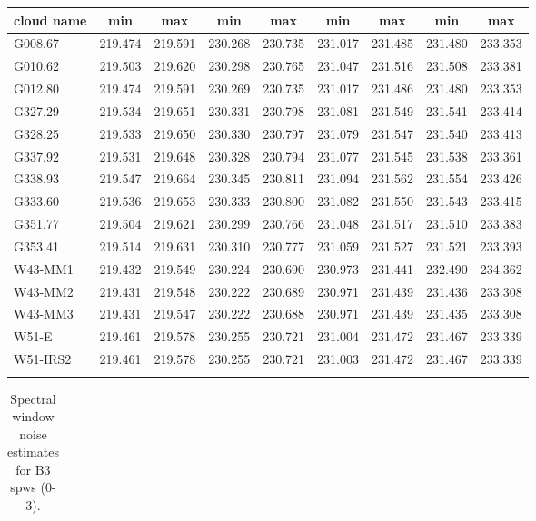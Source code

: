 \documentclass[longauth]{aa} %
\begin{document}
\begin{appendix}
\begin{table}[htbp!]
\begin{tabular}{@{\extracolsep{6pt}}lcccccccc@{}}
cloud name\tnote{1}  & min & max  & min & max  & min & max  & min & max  \\
\hline \noalign {\smallskip}
G008.67 & 219.474&219.591&230.268&230.735&231.017&231.485&231.480&233.353 \\
G010.62 & 219.503&219.620&230.298&230.765&231.047&231.516&231.508&233.381 \\
G012.80 & 219.474&219.591&230.269&230.735&231.017&231.486&231.480&233.353 \\
G327.29 & 219.534&219.651&230.331&230.798&231.081&231.549&231.541&233.414 \\
G328.25 & 219.533&219.650&230.330&230.797&231.079&231.547&231.540&233.413 \\
G337.92 & 219.531&219.648&230.328&230.794&231.077&231.545&231.538&233.361 \\
G338.93 & 219.547&219.664&230.345&230.811&231.094&231.562&231.554&233.426 \\
G333.60 & 219.536&219.653&230.333&230.800&231.082&231.550&231.543&233.415 \\
G351.77 & 219.504&219.621&230.299&230.766&231.048&231.517&231.510&233.383 \\
G353.41 & 219.514&219.631&230.310&230.777&231.059&231.527&231.521&233.393 \\
W43-MM1 & 219.432&219.549&230.224&230.690&230.973&231.441&232.490&234.362 \\
W43-MM2 & 219.431&219.548&230.222&230.689&230.971&231.439&231.436&233.308 \\
W43-MM3 & 219.431&219.547&230.222&230.688&230.971&231.439&231.435&233.308 \\
W51-E & 219.461&219.578&230.255&230.721&231.004&231.472&231.467&233.339 \\
W51-IRS2 & 219.461&219.578&230.255&230.721&231.003&231.472&231.467&233.339 \\
\hline \noalign {\smallskip}
\end{tabular}
\end{table}


\begin{table}[htbp!]
\centering
\caption{Spectral window noise estimates for B3 spws (0-3).}
\label{tab:spwsrms}
\begin{tabular}{@{\extracolsep{4pt}}lllllllllllll@{}}


\end{tabular}
\end{table}
\end{appendix}
\end{document}
